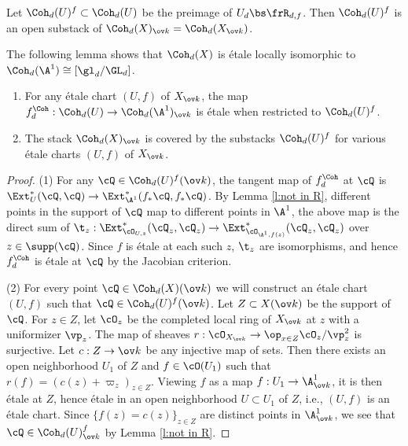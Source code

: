 Let $\Coh_{d}(U)^{f}\subset \Coh_{d}(U)$ be the preimage of $U_{d}\bs \frR_{d,f}$.  Then $\Coh_{d}(U)^{f}$ is an open substack of $\Coh_{d}(X)_{\ov k}=\Coh_{d}(X_{\ov k})$.

The following lemma shows that $\Coh_{d}(X)$ is \'etale locally isomorphic to $\Coh_{d}(\A^{1})\cong[\gl_{d}/\GL_{d}]$.
\begin{lemma}
\notready\label{l:Coh local}
\begin{enumerate}
\item For any \'etale chart $(U,f)$ of $X_{\ov k}$, the map $f^{\Coh}_{d}:\Coh_{d}(U)\to \Coh_{d}(\A^{1})_{\ov k}$  is \'etale when restricted to $\Coh_{d}(U)^{f}$.
\item The stack $\Coh_{d}(X)_{\ov k}$ is covered by the substacks $\Coh_{d}(U)^{f}$ for various \'etale charts $(U,f)$ of $X_{\ov k}$.
\end{enumerate}
\end{lemma}
\begin{proof}
(1) For any $\cQ\in \Coh_{d}(U)^{f}(\ov k)$, the tangent map of $f_{d}^{\Coh}$  at $\cQ$ is $\Ext^{*}_{U}(\cQ,\cQ)\to \Ext^{*}_{\A^{1}}(f_{*}\cQ, f_{*}\cQ)$. By Lemma \ref{l:not in R}, different points in the support of $\cQ$ map to different points in $\A^{1}$, the above map is the direct sum of $\t_{z}: \Ext^{*}_{\cO_{U,z}}(\cQ_{z},\cQ_{z})\to \Ext^{*}_{\cO_{\A^{1},f(z)}}(\cQ_{z}, \cQ_{z})$ over $z\in \supp(\cQ)$. Since $f$ is \'etale at each such $z$, $\t_{z}$  are isomorphisms, and hence $f_{d}^{\Coh}$ is \'etale at $\cQ$ by the Jacobian criterion.

(2) For every point $\cQ\in \Coh_{d}(X)(\ov k)$ we will construct an \'etale chart $(U,f)$ such that $\cQ\in \Coh_{d}(U)^{f}(\ov k)$.  Let $Z\subset X(\ov k)$ be the support of $\cQ$.  For $z\in Z$, let $\cO_{z}$ be the completed local ring of $X_{\ov k}$ at $z$ with a uniformizer $\vp_{z}$. The map of sheaves $r: \cO_{X_{\ov k}}\to \op_{x\in Z}\cO_{z}/\vp_{z}^{2}$ is surjective. Let $c:Z\to \ov k$ be any injective map of sets. Then there exists an open neighborhood $U_{1}$ of $Z$ and $f\in \cO(U_{1})$ such that $r(f)=(c(z)+\varpi_{z})_{z\in Z}$. Viewing $f$ as a map $f: U_{1}\to \A^{1}_{\ov k}$, it is then \'etale at $Z$, hence \'etale in an open neighborhood $U\subset U_{1}$ of $Z$, i.e., $(U,f)$ is an \'etale chart. Since  $\{f(z)=c(z)\}_{z\in Z}$ are distinct points in $\A^{1}_{\ov k}$, we see that $\cQ\in \Coh_{d}(U)^{f}_{\ov k}$ by Lemma \ref{l:not in R}.
 \end{proof}

